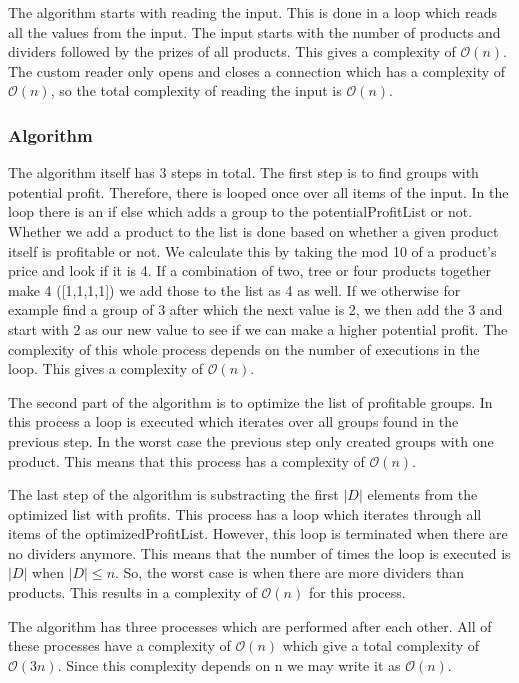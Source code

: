 \documentclass{article}
\newcommand{\bigO}[1]{\mathcal{O}(#1)}
\begin{document}
The algorithm starts with reading the input. This is done in a loop which reads all the values from the input. The input starts with the number of products and dividers followed by the prizes of all products. This gives a complexity of $\bigO{n}$. The custom reader only opens and closes a connection which has a complexity of $\bigO{n}$, so the total complexity of reading the input is $\bigO{n}$.

\subsubsection{Algorithm}
The algorithm itself has 3 steps in total. The first step is to find groups with potential profit. Therefore, there is looped once over all items of the input. In the loop there is an if else which adds a group to the potentialProfitList or not. Whether we add a product to the list is done based on whether a given product itself is profitable or not. We calculate this by taking the mod 10 of a product's price and look if it is 4. If a combination of two, tree or four products together make 4 ([1,1,1,1]) we add those to the list as 4 as well. If we otherwise for example find a group of 3 after which the next value is 2, we then add the 3 and start with 2 as our new value to see if we can make a higher potential profit. The complexity of this whole process depends on the number of executions in the loop. This gives a complexity of $\bigO{n}$.

The second part of the algorithm is to optimize the list of profitable groups. In this process a loop is executed which iterates over all groups found in the previous step. In the worst case the previous step only created groups with one product. This means that this process has a complexity of $\bigO{n}$.

The last step of the algorithm is substracting the first $|D|$ elements from the optimized list with profits. This process has a loop which iterates through all items of the optimizedProfitList. However, this loop is terminated when there are no dividers anymore. This means that the number of times the loop is executed is $|D|$ when $|D| \leq n$. So, the worst case is when there are more dividers than products. This results in a complexity of $\bigO{n}$ for this process.

The algorithm has three processes which are performed after each other. All of these processes have a complexity of $\bigO{n}$ which give a total complexity of $\bigO{3n}$. Since this complexity depends on n we may write it as $\bigO{n}$.
\end{document}
